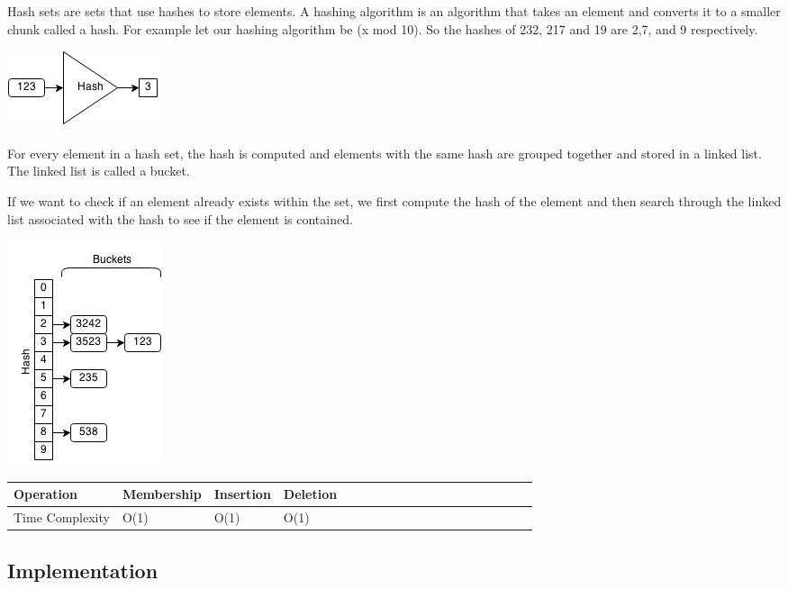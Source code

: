 \documentclass[11pt,oneside]{book}
\makeatletter
\def\maxwidth#1{\ifdim\Gin@nat@width>#1 #1\else\Gin@nat@width\fi}
\makeatother
\begin{document}
Hash sets are sets that use hashes to store elements. A hashing algorithm is an algorithm that takes an element and converts it to a smaller chunk called a hash. For example let our hashing algorithm be (x mod 10). So the hashes of 232, 217 and 19 are 2,7, and 9 respectively.

\vspace{5px}\includegraphics[width=\maxwidth{\textwidth}]{hashcode.png}

For every element in a hash set, the hash is computed and elements with the same hash are grouped together and stored in a linked list. The linked list is called a bucket.

If we want to check if an element already exists within the set, we first compute the hash of the element and then search through the linked list associated with the hash to see if the element is contained.

\vspace{5px}\includegraphics[width=\maxwidth{\textwidth}]{hashset.png}

\vspace{10px}\begin{tabulary}{0.4\linewidth}{|l|l|l|l|l|l|l|l|l|l|l|l|l|l|l|l|l|l|l}\hline


  Operation &
  Membership &
  Insertion &
  Deletion\\
\hline


  Time Complexity &
  O(1) &
  O(1) &
  O(1)\\

\hline\end{tabulary}

\subsection{Implementation}
\end{document}
